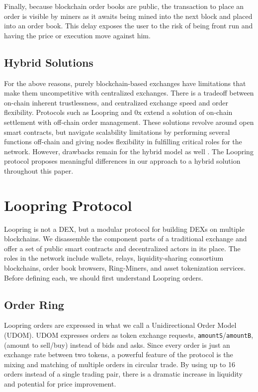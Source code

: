 \documentclass[UTF8,nofonts]{article}
\begin{document}
\begin{multicols}{2}
Finally, because blockchain order books are public, the transaction to place an order is visible by miners as it awaits being mined into the next block and placed into an order book. This delay exposes the user to the risk of being front run and having the price or execution move against him.

\subsection{Hybrid Solutions}
For the above reasons, purely blockchain-based exchanges have limitations that make them uncompetitive with centralized exchanges. There is a tradeoff between on-chain inherent trustlessness, and centralized exchange speed and order flexibility. Protocols such as Loopring and 0x \cite{warren20170x} extend a solution of on-chain settlement with off-chain order management. These solutions revolve around open smart contracts, but navigate scalability limitations by performing several functions off-chain and giving nodes flexibility in fulfilling critical roles for the network. However, drawbacks remain for the hybrid model as well \cite{costofdecent}. The Loopring protocol proposes meaningful differences in our approach to a hybrid solution throughout this paper.


\section{Loopring Protocol\label{sec:loopring_protocol}}
Loopring is not a DEX, but a modular protocol for building DEXs on multiple blockchains. We disassemble the component parts of a traditional exchange and offer a set of public smart contracts and decentralized actors in its place. The roles in the network include wallets, relays, liquidity-sharing consortium blockchains, order book browsers, Ring-Miners, and asset tokenization services. Before defining each, we should first understand Loopring orders. 

\subsection{Order Ring\label{sec:order_ring}}
Loopring orders are expressed in what we call a Unidirectional Order Model (UDOM)\cite{coinport2014udom}. UDOM expresses orders as token exchange requests, \verb|amountS|/\verb|amountB|, (amount to sell/buy)  instead of bids and asks. Since every order is just an exchange rate between two tokens, a powerful feature of the protocol is the mixing and matching of multiple orders in circular trade. By using up to 16 orders instead of a single trading pair, there is a dramatic increase in liquidity and potential for price improvement. 


\end{multicols}
\end{document}

